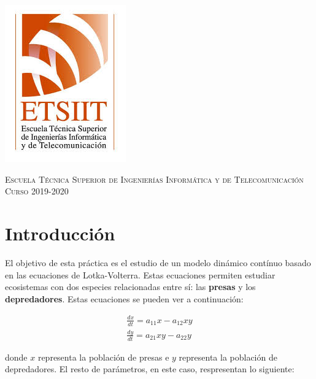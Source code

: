 \documentclass[11pt,a4paper]{article}
\begin{document}
\begin{titlepage}
\begin{minipage}{\textwidth}
\includegraphics[scale=0.3]{img/etsiit.jpeg}

\vspace{0.7cm}
\textsc{Escuela Técnica Superior de Ingenierías Informática y de Telecomunicación}\\
\vspace{1cm}
\textsc{Curso 2019-2020}
\end{minipage}
\end{titlepage}

\tableofcontents
\thispagestyle{empty}				%

\newpage

\setlength{\parskip}{1em}

\section{Introducción}

El objetivo de esta práctica es el estudio de un modelo dinámico contínuo basado
en las ecuaciones de Lotka-Volterra. Estas ecuaciones permiten estudiar ecosistemas
con dos especies relacionadas entre sí: las \textbf{presas} y los \textbf{depredadores}.
Estas ecuaciones se pueden ver a continuación:

\begin{equation}
\begin{split}
\frac{dx}{dt} = a_{11}x - a_{12}xy \\
\frac{dy}{dt} = a_{21}xy - a_{22}y
\end{split}
\end{equation}

\noindent donde $x$ representa la población de presas e $y$ representa la población
de depredadores. El resto de parámetros, en este caso, respresentan lo siguiente:
\end{document}

